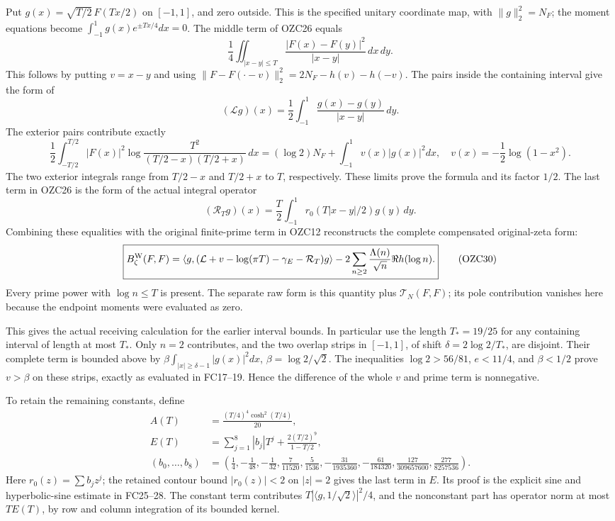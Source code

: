 \documentclass[
  10pt,
  a4paper,
]{article}
\begin{document}
Put \(g(x)=\sqrt{T/2}\,F(Tx/2)\) on \([-1,1]\), and zero outside. This
is the specified unitary coordinate map, with \(\|g\|_2^2=N_F\); the
moment equations become \(\int_{-1}^1g(x)e^{\pm Tx/4}dx=0\). The middle
term of OZC26 equals \[
\frac14\iint_{|x-y|\le T}
\frac{|F(x)-F(y)|^2}{|x-y|}\,dx\,dy.
\tag{OZC27}
\] This follows by putting \(v=x-y\) and using
\(\|F-F(\cdot-v)\|_2^2=2N_F-h(v)-h(-v)\). The pairs inside the
containing interval give the form of \[
(\mathcal Lg)(x)=\frac12\int_{-1}^1\frac{g(x)-g(y)}{|x-y|}\,dy.
\] The exterior pairs contribute exactly \[
\frac12\int_{-T/2}^{T/2}|F(x)|^2
\log\frac{T^2}{(T/2-x)(T/2+x)}\,dx
=(\log2)N_F+\int_{-1}^1v(x)|g(x)|^2dx,
\quad v(x)=-\frac12\log(1-x^2).
\tag{OZC28}
\] The two exterior integrals range from \(T/2-x\) and \(T/2+x\) to
\(T\), respectively. These limits prove the formula and its factor
\(1/2\). The last term in OZC26 is the form of the actual integral
operator \[
(\mathcal R_Tg)(x)=\frac T2\int_{-1}^1
r_0(T|x-y|/2)g(y)\,dy.
\tag{OZC29}
\] Combining these equalities with the original finite-prime term in
OZC12 reconstructs the complete compensated original-zeta form: \[
\boxed{
B_\zeta^{\rm W}(F,F)=
\langle g,(\mathcal L+v-\log(\pi T)-\gamma_E-\mathcal R_T)g\rangle
-2\sum_{n\ge2}\frac{\Lambda(n)}{\sqrt n}\Re h(\log n).}
\tag{OZC30}
\] Every prime power with \(\log n\le T\) is present. The separate raw
form is this quantity plus \(\mathcal T_N(F,F)\); its pole contribution
vanishes here because the endpoint moments were evaluated as zero.

This gives the actual receiving calculation for the earlier interval
bounds. In particular use the length \(T_*=19/25\) for any containing
interval of length at most \(T_*\). Only \(n=2\) contributes, and the
two overlap strips in \([-1,1]\), of shift \(\delta=2\log2/T_*\), are
disjoint. Their complete term is bounded above by
\(\beta\int_{|x|\ge\delta-1}|g(x)|^2dx\), \(\beta=\log2/\sqrt2\). The
inequalities \(\log2>56/81\), \(e<11/4\), and \(\beta<1/2\) prove
\(v>\beta\) on these strips, exactly as evaluated in FC17--19. Hence the
difference of the whole \(v\) and prime term is nonnegative.

To retain the remaining constants, define \[
\begin{aligned}
A(T)&=\frac{(T/4)^4\cosh^2(T/4)}{20},\\
E(T)&=\sum_{j=1}^{8}|b_j|T^j+\frac{2(T/2)^9}{1-T/2},\\
(b_0,\ldots,b_8)&=
\left(\frac14,-\frac1{48},-\frac1{32},\frac7{11520},\frac5{1536},
-\frac{31}{1935360},-\frac{61}{184320},
\frac{127}{309657600},\frac{277}{8257536}\right).
\end{aligned}
\tag{OZC31}
\] Here \(r_0(z)=\sum b_jz^j\); the retained contour bound
\(|r_0(z)|<2\) on \(|z|=2\) gives the last term in \(E\). Its proof is
the explicit sine and hyperbolic-sine estimate in FC25--28. The constant
term contributes \(T|\langle g,1/\sqrt2\rangle|^2/4\), and the
nonconstant part has operator norm at most \(TE(T)\), by row and column
integration of its bounded kernel.
\end{document}
